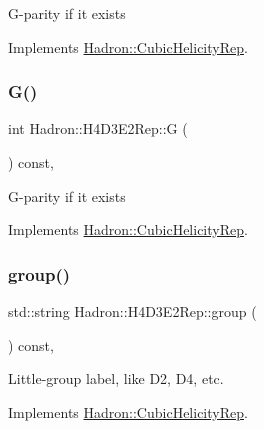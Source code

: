 G-\/parity if it exists 

Implements \mbox{\hyperlink{structHadron_1_1CubicHelicityRep_a50689f42be1e6170aa8cf6ad0597018b}{Hadron\+::\+Cubic\+Helicity\+Rep}}.

\mbox{\label{structHadron_1_1H4D3E2Rep_a2fb62d571edaca91fd4f1f7f6ada2fbd}} 
\subsubsection{\texorpdfstring{G()}{G()}\hspace{0.1cm}{\footnotesize\ttfamily [2/2]}}
{\footnotesize\ttfamily int Hadron\+::\+H4\+D3\+E2\+Rep\+::G (\begin{DoxyParamCaption}{ }\end{DoxyParamCaption}) const\hspace{0.3cm}{\ttfamily [inline]}, {\ttfamily [virtual]}}

G-\/parity if it exists 

Implements \mbox{\hyperlink{structHadron_1_1CubicHelicityRep_a50689f42be1e6170aa8cf6ad0597018b}{Hadron\+::\+Cubic\+Helicity\+Rep}}.

\mbox{\label{structHadron_1_1H4D3E2Rep_a362911306406bcb51e8c6865513d5c44}} 
\subsubsection{\texorpdfstring{group()}{group()}\hspace{0.1cm}{\footnotesize\ttfamily [1/3]}}
{\footnotesize\ttfamily std\+::string Hadron\+::\+H4\+D3\+E2\+Rep\+::group (\begin{DoxyParamCaption}{ }\end{DoxyParamCaption}) const\hspace{0.3cm}{\ttfamily [inline]}, {\ttfamily [virtual]}}

Little-\/group label, like D2, D4, etc. 

Implements \mbox{\hyperlink{structHadron_1_1CubicHelicityRep_a101a7d76cd8ccdad0f272db44b766113}{Hadron\+::\+Cubic\+Helicity\+Rep}}.

\mbox{\label{structHadron_1_1H4D3E2Rep_a362911306406bcb51e8c6865513d5c44}} 
